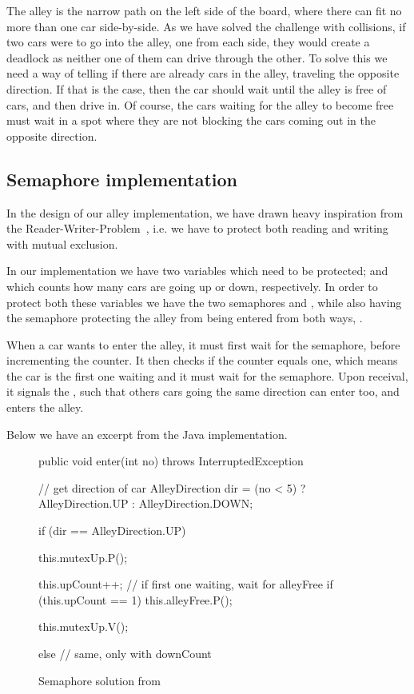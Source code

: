 
The alley is the narrow path on the left side of the board, where
there can fit no more than one car side-by-side. As we have solved the
challenge with collisions, if two cars were to go into the alley, one
from each side, they would create a deadlock as neither one of them
can drive through the other. To solve this we need a way of telling if
there are already cars in the alley, traveling the opposite
direction. If that is the case, then the car should wait until the
alley is free of cars, and then drive in. Of course, the cars waiting
for the alley to become free must wait in a spot where they are not
blocking the cars coming out in the opposite direction.


\subsection{Semaphore implementation}
\label{sub:all-sema}
In the design of our alley implementation, we have drawn heavy inspiration from the
Reader-Writer-Problem~\cite[p. 170]{andrews}, i.e. we have to protect
both reading and writing with mutual exclusion.

In our implementation we have two variables which need to be
protected;  and  which counts how many
cars are going up or down, respectively. In order to protect both
these variables we have the two semaphores  and
, while also having the semaphore protecting the alley
from being entered from both ways, .

When a car wants to enter the alley, it must first wait for the
 semaphore, before incrementing the counter. It then checks if the counter
equals one, which means the car is the first one waiting and it must wait
for the  semaphore. Upon receival, it signals the
, such that others cars going the same direction can enter too, and enters the alley.

Below we have an excerpt from the Java implementation.

\begin{figure}[H]
\label{lst:all-sem}
  \begin{java}
public void enter(int no) throws InterruptedException {
  // get direction of car
  AlleyDirection dir = (no < 5) ? AlleyDirection.UP : AlleyDirection.DOWN;

  if (dir == AlleyDirection.UP) {
    this.mutexUp.P();

    this.upCount++;
    // if first one waiting, wait for alleyFree
    if (this.upCount == 1)
      this.alleyFree.P();

    this.mutexUp.V();

  } else {
    // same, only with downCount
  }
}
  \end{java}
  \caption{Semaphore solution from }
\end{figure}

